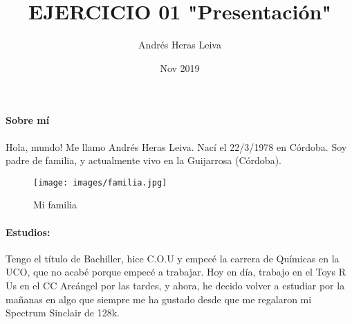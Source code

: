 \documentclass[12pt]{article}
\title{ EJERCICIO 01 "Presentación"}
\author{Andrés Heras Leiva }
\date{Nov 2019}
\begin{document}
\maketitle
\centering

\paragraph {\huge {Sobre mí}}
\begin{flushleft}Hola, mundo! Me llamo Andrés Heras Leiva. Nací el 22/3/1978 en Córdoba. Soy padre de familia, y actualmente vivo en la Guijarrosa (Córdoba).
\end{flushleft}
\begin{figure}[h!]
\centering
\texttt{[image: images/familia.jpg]}
\caption{Mi familia}
\end{figure}
\paragraph{\huge {Estudios:}}
\begin{flushleft}Tengo el título de Bachiller, hice C.O.U y empecé la carrera de Químicas en la UCO, que no acabé porque empecé a trabajar.
Hoy en día, trabajo en el Toys R Us en el CC Arcángel  por las tardes, y ahora, he decido volver a estudiar por la mañanas en algo que 
siempre me ha gustado desde que me regalaron mi Spectrum Sinclair de 128k.
\end{flushleft}
\end{document}

